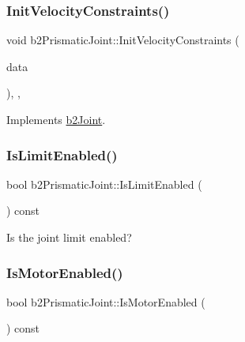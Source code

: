 \subsubsection{\texorpdfstring{InitVelocityConstraints()}{InitVelocityConstraints()}}
{\footnotesize\ttfamily void b2\+Prismatic\+Joint\+::\+Init\+Velocity\+Constraints (\begin{DoxyParamCaption}\item[{const \mbox{\hyperlink{structb2_solver_data}{b2\+Solver\+Data}} \&}]{data }\end{DoxyParamCaption})\hspace{0.3cm}{\ttfamily [override]}, {\ttfamily [protected]}, {\ttfamily [virtual]}}



Implements \mbox{\hyperlink{classb2_joint_a599c013de5514e02684b958b31dd76a4}{b2\+Joint}}.

\mbox{\label{classb2_prismatic_joint_a22e2442a17832f718447c63c9c6263c8}} 
\subsubsection{\texorpdfstring{IsLimitEnabled()}{IsLimitEnabled()}}
{\footnotesize\ttfamily bool b2\+Prismatic\+Joint\+::\+Is\+Limit\+Enabled (\begin{DoxyParamCaption}{ }\end{DoxyParamCaption}) const}



Is the joint limit enabled? 

\mbox{\label{classb2_prismatic_joint_a06492dabf33439efdebceb29899c7fc9}} 
\subsubsection{\texorpdfstring{IsMotorEnabled()}{IsMotorEnabled()}}
{\footnotesize\ttfamily bool b2\+Prismatic\+Joint\+::\+Is\+Motor\+Enabled (\begin{DoxyParamCaption}{ }\end{DoxyParamCaption}) const}



